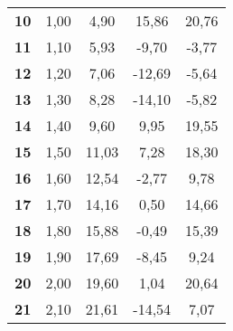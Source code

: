 \documentclass[11.5pt, arev]{article}
\begin{document}
\begin{center}
\begin{table}[]
\begin{tabular}{|c|cccc}
\textbf{10} & 1,00                                   & 4,90                                   & 15,86                                 & 20,76                                             \\ \cline{1-1}
\textbf{11} & 1,10                                   & 5,93                                   & -9,70                                 & -3,77                                             \\ \cline{1-1}
\textbf{12} & 1,20                                   & 7,06                                   & -12,69                                & -5,64                                             \\ \cline{1-1}
\textbf{13} & 1,30                                   & 8,28                                   & -14,10                                & -5,82                                             \\ \cline{1-1}
\textbf{14} & 1,40                                   & 9,60                                   & 9,95                                  & 19,55                                             \\ \cline{1-1}
\textbf{15} & 1,50                                   & 11,03                                  & 7,28                                  & 18,30                                             \\ \cline{1-1}
\textbf{16} & 1,60                                   & 12,54                                  & -2,77                                 & 9,78                                              \\ \cline{1-1}
\textbf{17} & 1,70                                   & 14,16                                  & 0,50                                  & 14,66                                             \\ \cline{1-1}
\textbf{18} & 1,80                                   & 15,88                                  & -0,49                                 & 15,39                                             \\ \cline{1-1}
\textbf{19} & 1,90                                   & 17,69                                  & -8,45                                 & 9,24                                              \\ \cline{1-1}
\textbf{20} & 2,00                                   & 19,60                                  & 1,04                                  & 20,64                                             \\ \cline{1-1}
\textbf{21} & 2,10                                   & 21,61                                  & -14,54                                & 7,07                                              \\ \cline{1-1}
\end{tabular}
\end{table}
\label{tab:full}
\end{center}
\end{document}
